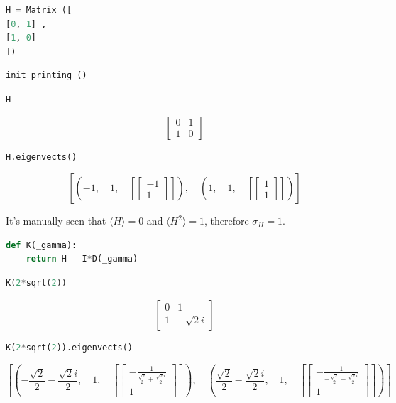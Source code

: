 \begin{lstlisting}[language=Python]
H = Matrix ([
[0, 1] ,
[1, 0]
])
\end{lstlisting}

\begin{lstlisting}[language=Python]
init_printing ()
\end{lstlisting}

\begin{lstlisting}[language=Python]
H
\end{lstlisting}

\[\left[\begin{matrix}0 & 1\\1 & 0\end{matrix}\right]\]

\begin{lstlisting}[language=Python]
H.eigenvects()
\end{lstlisting}

\[\left [ \left ( -1, \quad 1, \quad \left [ \left[\begin{matrix}-1\\1\end{matrix}\right]\right ]\right ), \quad \left ( 1, \quad 1, \quad \left [ \left[\begin{matrix}1\\1\end{matrix}\right]\right ]\right )\right ]\]

It's manually seen that \(\langle H \rangle = 0\) and
\(\langle H^2 \rangle = 1\), therefore \(\sigma_{H} = 1\).

\begin{lstlisting}[language=Python]
def K(_gamma):
    return H - I*D(_gamma)
\end{lstlisting}

\begin{lstlisting}[language=Python]
K(2*sqrt(2))
\end{lstlisting}

\[\left[\begin{matrix}0 & 1\\1 & - \sqrt{2} i\end{matrix}\right]\]

\begin{lstlisting}[language=Python]
K(2*sqrt(2)).eigenvects()
\end{lstlisting}

\[\left [ \left ( - \frac{\sqrt{2}}{2} - \frac{\sqrt{2} i}{2}, \quad 1, \quad \left [ \left[\begin{matrix}- \frac{1}{\frac{\sqrt{2}}{2} + \frac{\sqrt{2} i}{2}}\\1\end{matrix}\right]\right ]\right ), \quad \left ( \frac{\sqrt{2}}{2} - \frac{\sqrt{2} i}{2}, \quad 1, \quad \left [ \left[\begin{matrix}- \frac{1}{- \frac{\sqrt{2}}{2} + \frac{\sqrt{2} i}{2}}\\1\end{matrix}\right]\right ]\right )\right ]\]

